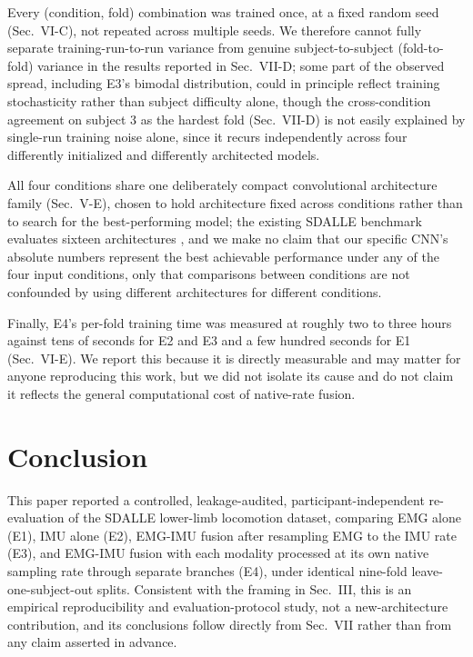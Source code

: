 \documentclass[conference]{IEEEtran}
\begin{document}
Every (condition, fold) combination was trained once, at a fixed
random seed (Sec.~VI-C), not repeated across multiple seeds. We
therefore cannot fully separate training-run-to-run variance from
genuine subject-to-subject (fold-to-fold) variance in the results
reported in Sec.~VII-D; some part of the observed spread, including
E3's bimodal distribution, could in principle reflect training
stochasticity rather than subject difficulty alone, though the
cross-condition agreement on subject 3 as the hardest fold
(Sec.~VII-D) is not easily explained by single-run training noise
alone, since it recurs independently across four differently
initialized and differently architected models.

All four conditions share one deliberately compact convolutional
architecture family (Sec.~V-E), chosen to hold architecture fixed
across conditions rather than to search for the best-performing
model; the existing SDALLE benchmark evaluates sixteen architectures
\cite{farouk2026sdalle}, and we make no claim that our specific CNN's
absolute numbers represent the best achievable performance under any
of the four input conditions, only that comparisons between
conditions are not confounded by using different architectures for
different conditions.

Finally, E4's per-fold training time was measured at roughly two to
three hours against tens of seconds for E2 and E3 and a few hundred
seconds for E1 (Sec.~VI-E). We report this because it is directly
measurable and may matter for anyone reproducing this work, but we
did not isolate its cause and do not claim it reflects the general
computational cost of native-rate fusion.

\section{Conclusion}
\label{sec:conclusion}

This paper reported a controlled, leakage-audited,
participant-independent re-evaluation of the SDALLE lower-limb
locomotion dataset, comparing EMG alone (E1), IMU alone (E2), EMG-IMU
fusion after resampling EMG to the IMU rate (E3), and EMG-IMU fusion
with each modality processed at its own native sampling rate through
separate branches (E4), under identical nine-fold
leave-one-subject-out splits. Consistent with the framing in Sec.~III,
this is an empirical reproducibility and evaluation-protocol study,
not a new-architecture contribution, and its conclusions follow
directly from Sec.~VII rather than from any claim asserted in
advance.
\end{document}
